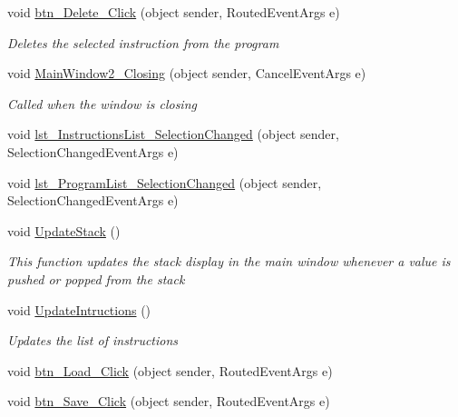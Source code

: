 \begin{DoxyCompactItemize}
void \hyperlink{class_c_p_u___o_s___simulator_1_1_main_window_a96ea1acde80b84701b58c1d4aaed2b9f}{btn\+\_\+\+Delete\+\_\+\+Click} (object sender, Routed\+Event\+Args e)
\begin{DoxyCompactList}\small\item\em Deletes the selected instruction from the program \end{DoxyCompactList}\item 
void \hyperlink{class_c_p_u___o_s___simulator_1_1_main_window_a622fd6a40ff66a4a87c3d31ccef4313c}{Main\+Window2\+\_\+\+Closing} (object sender, Cancel\+Event\+Args e)
\begin{DoxyCompactList}\small\item\em Called when the window is closing \end{DoxyCompactList}\item 
void \hyperlink{class_c_p_u___o_s___simulator_1_1_main_window_a5013d1984fc170246a5dc0d26c6fc493}{lst\+\_\+\+Instructions\+List\+\_\+\+Selection\+Changed} (object sender, Selection\+Changed\+Event\+Args e)
\item 
void \hyperlink{class_c_p_u___o_s___simulator_1_1_main_window_ab563b461cf3d62bd3c88eeb7921bfa75}{lst\+\_\+\+Program\+List\+\_\+\+Selection\+Changed} (object sender, Selection\+Changed\+Event\+Args e)
\item 
void \hyperlink{class_c_p_u___o_s___simulator_1_1_main_window_abd01bb7788b0c104045bcc93cf03c9d6}{Update\+Stack} ()
\begin{DoxyCompactList}\small\item\em This function updates the stack display in the main window whenever a value is pushed or popped from the stack \end{DoxyCompactList}\item 
void \hyperlink{class_c_p_u___o_s___simulator_1_1_main_window_a677bf9ebdb9fe30caa0f52f93e5390c9}{Update\+Intructions} ()
\begin{DoxyCompactList}\small\item\em Updates the list of instructions \end{DoxyCompactList}\item 
void \hyperlink{class_c_p_u___o_s___simulator_1_1_main_window_a13c54c19f906fc84076fe654f82f5398}{btn\+\_\+\+Load\+\_\+\+Click} (object sender, Routed\+Event\+Args e)
\item 
void \hyperlink{class_c_p_u___o_s___simulator_1_1_main_window_a3bbf0774868d6b5da4ff08d70e236fa6}{btn\+\_\+\+Save\+\_\+\+Click} (object sender, Routed\+Event\+Args e)
\item 

\end{DoxyCompactItemize}
